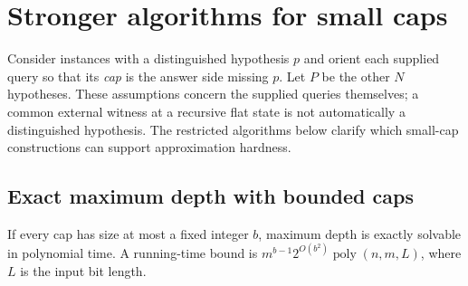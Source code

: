 \section{Stronger algorithms for small caps}
\label{sec:small-caps}

Consider instances with a distinguished hypothesis $p$ and orient
each supplied query so that its \emph{cap} is the answer side missing
$p$. Let $P$ be the other $N$ hypotheses. These assumptions concern
the supplied queries themselves; a common external witness at a
recursive flat state is not automatically a distinguished hypothesis.
The restricted algorithms below clarify which small-cap constructions
can support approximation hardness.

\subsection{Exact maximum depth with bounded caps}

\begin{theorem}\label{thm:bounded-cap-height}
If every cap has size at most a fixed integer $b$, maximum depth is
exactly solvable in polynomial time. A running-time bound is
$m^{b-1}2^{O(b^2)}\operatorname{poly}(n,m,L)$, where $L$ is the
input bit length.
\end{theorem}


